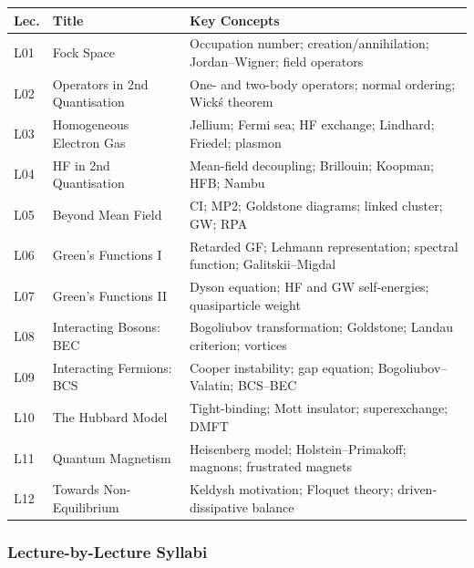 \documentclass[11pt,a4paper]{article}
\begin{document}
{\footnotesize
\begin{center}
\begin{tabular}{@{}lp{4.2cm}p{6.8cm}@{}}
\toprule
\textbf{Lec.} & \textbf{Title} & \textbf{Key Concepts}\\
\midrule
L01 & Fock Space & Occupation number; creation/annihilation; Jordan--Wigner; field operators\\
L02 & Operators in 2nd Quantisation & One- and two-body operators; normal ordering; Wick\'s theorem\\
L03 & Homogeneous Electron Gas & Jellium; Fermi sea; HF exchange; Lindhard; Friedel; plasmon\\
L04 & HF in 2nd Quantisation & Mean-field decoupling; Brillouin; Koopman; HFB; Nambu\\
L05 & Beyond Mean Field & CI; MP2; Goldstone diagrams; linked cluster; GW; RPA\\
L06 & Green's Functions I & Retarded GF; Lehmann representation; spectral function; Galitskii--Migdal\\
\midrule
L07 & Green's Functions II & Dyson equation; HF and GW self-energies; quasiparticle weight\\
L08 & Interacting Bosons: BEC & Bogoliubov transformation; Goldstone; Landau criterion; vortices\\
L09 & Interacting Fermions: BCS & Cooper instability; gap equation; Bogoliubov--Valatin; BCS--BEC\\
L10 & The Hubbard Model & Tight-binding; Mott insulator; superexchange; DMFT\\
L11 & Quantum Magnetism & Heisenberg model; Holstein--Primakoff; magnons; frustrated magnets\\
L12 & Towards Non-Equilibrium & Keldysh motivation; Floquet theory; driven-dissipative balance\\
\bottomrule
\end{tabular}
\end{center}
}

\subsubsection*{Lecture-by-Lecture Syllabi}
\end{document}

